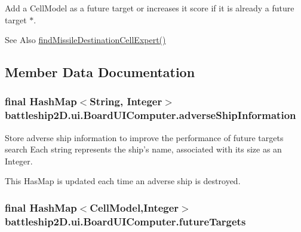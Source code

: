 Add a Cell\-Model as a future target or increases it score if it is already a future target $\ast$. 

\begin{DoxySeeAlso}{See Also}
\hyperlink{classbattleship2D_1_1ui_1_1BoardUIComputer_a2291bd3adb54e7414eb484d28fdec820}{find\-Missile\-Destination\-Cell\-Expert()} 
\end{DoxySeeAlso}


\subsection{Member Data Documentation}
\hypertarget{classbattleship2D_1_1ui_1_1BoardUIComputer_adf7a02abc86da93e185ff514c12e9265}{
\subsubsection[{adverse\-Ship\-Information}]{\setlength{\rightskip}{0pt plus 5cm}final Hash\-Map$<$String, Integer$>$ battleship2\-D.\-ui.\-Board\-U\-I\-Computer.\-adverse\-Ship\-Information\hspace{0.3cm}{\ttfamily [private]}}}\label{classbattleship2D_1_1ui_1_1BoardUIComputer_adf7a02abc86da93e185ff514c12e9265}


Store adverse ship information to improve the performance of future targets search Each string represents the ship's name, associated with its size as an Integer. 

This Has\-Map is updated each time an adverse ship is destroyed. \hypertarget{classbattleship2D_1_1ui_1_1BoardUIComputer_a1290864469f2ab3ba675119d1ac709f4}{
\subsubsection[{future\-Targets}]{\setlength{\rightskip}{0pt plus 5cm}final Hash\-Map$<${\bf Cell\-Model},Integer$>$ battleship2\-D.\-ui.\-Board\-U\-I\-Computer.\-future\-Targets\hspace{0.3cm}{\ttfamily [private]}}}\label{classbattleship2D_1_1ui_1_1BoardUIComputer_a1290864469f2ab3ba675119d1ac709f4}


